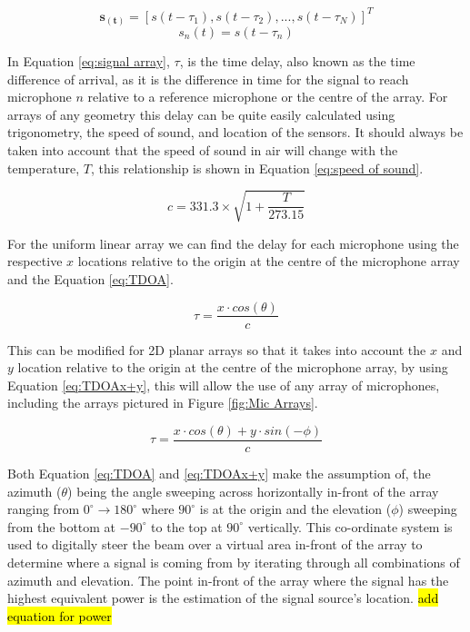 \documentclass{UoNMCHA}
\numberwithin{equation}{section}
\begin{document}
    \begin{equation}
        \mathbf{s_{(t)}} = [s(t-\tau_1), s(t-\tau_2), ..., s(t-\tau_N)]^T
        \label{eq:signal array}
    \end{equation}
    \begin{equation}
        s_n(t) = s(t-\tau_n)
        \label{eq:sensor signal}
    \end{equation}
    
    In Equation \ref{eq:signal array}, $\tau$, is the time delay, also known as the time difference of arrival, as it is the difference in time for the signal to reach microphone $n$ relative to a reference microphone or the centre of the array. For arrays of any geometry this delay can be quite easily calculated using trigonometry, the speed of sound, and location of the sensors. It should always be taken into account that the speed of sound in air will change with the temperature, $T$, this relationship is shown in Equation \ref{eq:speed of sound}. 
    
    \begin{equation}
        c = 331.3 \times \sqrt{1+\frac{T}{273.15}}
        \label{eq:speed of sound}
    \end{equation}
    
    For the uniform linear array we can find the delay for each microphone using the respective $x$ locations relative to the origin at the centre of the microphone array and the Equation \ref{eq:TDOA}.
    
    \begin{equation}
        \tau = \frac{x\cdot cos(\theta)}{c}
        \label{eq:TDOA}
    \end{equation}
    
    This can be modified for 2D planar arrays so that it takes into account the $x$ and $y$ location  relative to the origin at the centre of the microphone array, by using Equation \ref{eq:TDOAx+y}, this will allow the use of any array of microphones, including the arrays pictured in Figure \ref{fig:Mic Arrays}.
    
    \begin{equation}
        \tau = \frac{x \cdot cos(\theta) + y \cdot sin(-\phi)}{c}
        \label{eq:TDOAx+y}
    \end{equation}
    
    Both Equation \ref{eq:TDOA} and \ref{eq:TDOAx+y} make the assumption of, the azimuth ($\theta$) being the angle sweeping across horizontally in-front of the array ranging from $0^{\circ} \to 180^{\circ}$ where $90^{\circ}$ is at the origin and the elevation ($\phi$) sweeping from the bottom at $-90^{\circ}$ to the top at $90^{\circ}$ vertically. This co-ordinate system is used to digitally steer the beam over a virtual area in-front of the array to determine where a signal is coming from by iterating through all combinations of azimuth and elevation. The point in-front of the array where the signal has the highest equivalent power is the estimation of the signal source's location. \hl{add equation for power}
    
\end{document}
